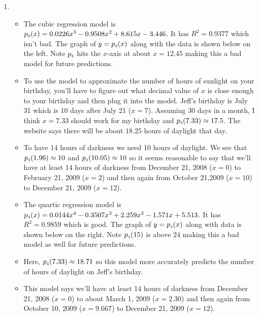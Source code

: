 \documentclass{ximera}
\begin{document}
\begin{enumerate}
\setcounter{enumi}{\value{HW}}


\item \begin{itemize} \item The cubic regression model is $p_{\mbox{\tiny $3$}}(x) = 0.0226x^{3} - 0.9508x^{2} + 8.615x - 3.446$.  It has $R^{2} = 0.9377$ which isn't bad.  The graph of $y = p_{\mbox{\tiny $3$}}(x)$ along with the data is shown below on the left.  Note $p_{\mbox{\tiny $3$}}$ hits the $x$-axis at about $x = 12.45$ making this a bad model for future predictions.  

\item To use the model to approximate the number of hours of sunlight on your birthday, you'll have to figure out what decimal value of $x$ is close enough to your birthday and then plug it into the model.  Jeff's birthday is July 31 which is 10 days after July 21 ($x = 7$).  Assuming 30 days in a month, I think $x = 7.33$ should work for my birthday and $p_{\mbox{\tiny $3$}}(7.33) \approx 17.5$.  The website says there will be about $18.25$ hours of daylight that day. 

\item  To have 14 hours of darkness we need 10 hours of daylight.  We see that $p_{\mbox{\tiny $3$}}(1.96) \approx 10$ and $p_{\mbox{\tiny $3$}}(10.05) \approx 10$ so it seems reasonable to say that we'll have at least 14 hours of darkness from December 21, 2008 ($x = 0$) to February 21, 2009 ($x = 2$) and then again from October 21,2009 ($x = 10$) to December 21, 2009 ($x = 12$).

\end{itemize}

\begin{itemize}

\item The quartic regression model is $p_{\mbox{\tiny $4$}}(x) = 0.0144x^{4} - 0.3507x^{3} + 2.259x^{2} - 1.571x + 5.513$.  It has $R^{2} = 0.9859$ which is good.  The graph of $y = p_{\mbox{\tiny $4$}}(x)$  along with data is shown below on the right.  Note  $p_{\mbox{\tiny $4$}}(15)$ is above $24$ making this a bad model as well for future predictions.  

\item Here, $p_{\mbox{\tiny $4$}}(7.33) \approx 18.71$ so this model more accurately predicts the number of hours of daylight on Jeff's birthday.  

\item This model says we'll have at least 14 hours of darkness from December 21, 2008 ($x = 0$) to about March 1, 2009 ($x = 2.30$) and then again from October 10, 2009 ($x = 9.667$) to December 21, 2009 ($x = 12$).


\end{itemize}
\end{enumerate}
\end{document}
